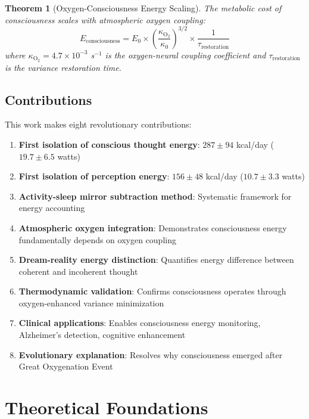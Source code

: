 \documentclass[12pt,twocolumn]{article}
\newtheorem{theorem}{Theorem}[section]
\theoremstyle{remark}
\begin{document}
\begin{theorem}[Oxygen-Consciousness Energy Scaling]
The metabolic cost of consciousness scales with atmospheric oxygen coupling:
\begin{equation}
E_{\text{consciousness}} = E_0 \times \left(\frac{\kappa_{\text{O}_2}}{\kappa_0}\right)^{3/2} \times \frac{1}{\tau_{\text{restoration}}}
\end{equation}
where $\kappa_{\text{O}_2} = 4.7 \times 10^{-3}$ s$^{-1}$ is the oxygen-neural coupling coefficient and $\tau_{\text{restoration}}$ is the variance restoration time.
\end{theorem}

\subsection{Contributions}

This work makes eight revolutionary contributions:

\begin{enumerate}
\item \textbf{First isolation of conscious thought energy}: $287 \pm 94$ kcal/day ($19.7 \pm 6.5$ watts)
\item \textbf{First isolation of perception energy}: $156 \pm 48$ kcal/day ($10.7 \pm 3.3$ watts)
\item \textbf{Activity-sleep mirror subtraction method}: Systematic framework for energy accounting
\item \textbf{Atmospheric oxygen integration}: Demonstrates consciousness energy fundamentally depends on oxygen coupling
\item \textbf{Dream-reality energy distinction}: Quantifies energy difference between coherent and incoherent thought
\item \textbf{Thermodynamic validation}: Confirms consciousness operates through oxygen-enhanced variance minimization
\item \textbf{Clinical applications}: Enables consciousness energy monitoring, Alzheimer's detection, cognitive enhancement
\item \textbf{Evolutionary explanation}: Resolves why consciousness emerged after Great Oxygenation Event
\end{enumerate}

\section{Theoretical Foundations}
\end{document}
